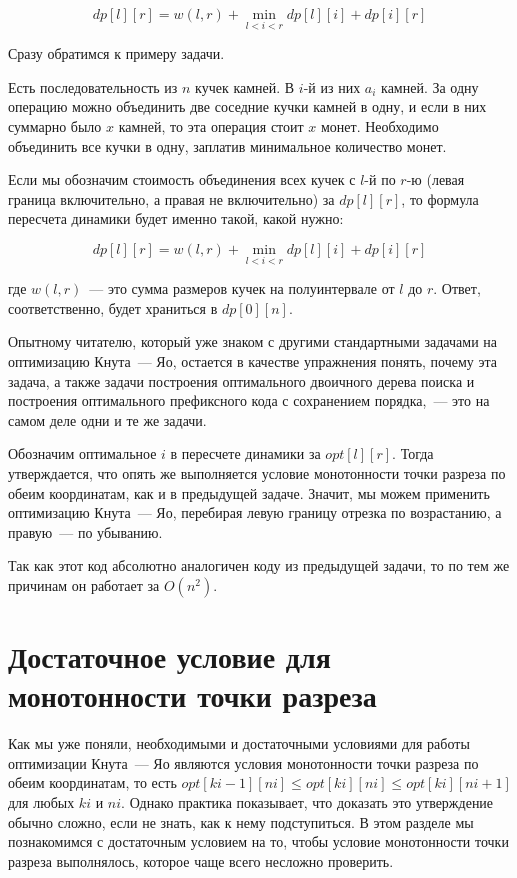 $$dp[l][r] = w(l, r) + \min_{l < i < r} dp[l][i] + dp[i][r]$$

Сразу обратимся к примеру задачи.

\begin{problem}
Есть последовательность из $n$ кучек камней. В $i$-й из них $a_i$ камней. За одну операцию можно объединить две соседние кучки камней в одну, и если в них суммарно было $x$ камней, то эта операция стоит $x$ монет. Необходимо объединить все кучки в одну, заплатив минимальное количество монет.
\end{problem}

Если мы обозначим стоимость объединения всех кучек с $l$-й по $r$-ю (левая граница включительно, а правая не включительно) за $dp[l][r]$, то формула пересчета динамики будет именно такой, какой нужно:

$$dp[l][r] = w(l, r) + \min_{l < i < r} dp[l][i] + dp[i][r]$$

где $w(l, r)$~--- это сумма размеров кучек на полуинтервале от $l$ до $r$. Ответ, соответственно, будет храниться в $dp[0][n]$.

\begin{exercise}
    Опытному читателю, который уже знаком с другими стандартными задачами на оптимизацию Кнута~--- Яо, остается в качестве упражнения понять, почему эта задача, а также задачи построения оптимального двоичного дерева поиска и построения оптимального префиксного кода с сохранением порядка,~--- это на самом деле одни и те же задачи.
\end{exercise}

Обозначим оптимальное $i$ в пересчете динамики за $opt[l][r]$. Тогда утверждается, что опять же выполняется условие монотонности точки разреза по обеим координатам, как и в предыдущей задаче. Значит, мы можем применить оптимизацию Кнута~--- Яо, перебирая левую границу отрезка по возрастанию, а правую~--- по убыванию.



Так как этот код абсолютно аналогичен коду из предыдущей задачи, то по тем же причинам он работает за $O(n^2)$.

\section{Достаточное условие для монотонности точки разреза}

Как мы уже поняли, необходимыми и достаточными условиями для работы оптимизации Кнута~--- Яо являются условия монотонности точки разреза по обеим координатам, то есть $opt[ki - 1][ni] \le opt[ki][ni] \le opt[ki][ni + 1]$ для любых $ki$ и $ni$. Однако практика показывает, что доказать это утверждение обычно сложно, если не знать, как к нему подступиться. В этом разделе мы познакомимся с достаточным условием на то, чтобы условие монотонности точки разреза выполнялось, которое чаще всего несложно проверить.

